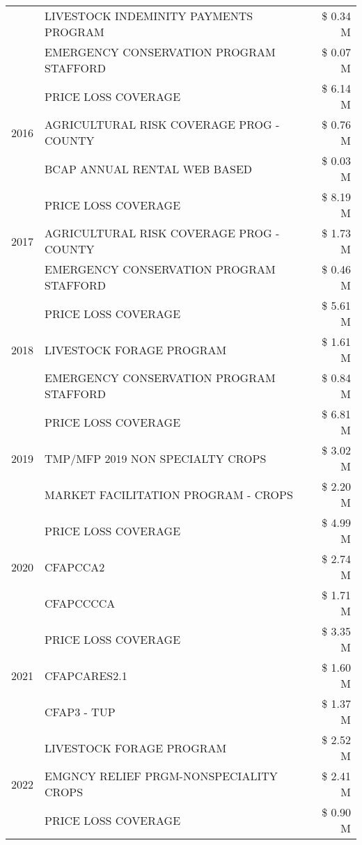 \begin{tabular}{llr}
 & LIVESTOCK INDEMINITY PAYMENTS PROGRAM & \$ 0.34 M \\
 & EMERGENCY CONSERVATION PROGRAM STAFFORD & \$ 0.07 M \\
\cline{1-3}
\multirow[t]{3}{*}{2016} & PRICE LOSS COVERAGE & \$ 6.14 M \\
 & AGRICULTURAL RISK COVERAGE PROG - COUNTY & \$ 0.76 M \\
 & BCAP ANNUAL RENTAL WEB BASED & \$ 0.03 M \\
\cline{1-3}
\multirow[t]{3}{*}{2017} & PRICE LOSS COVERAGE & \$ 8.19 M \\
 & AGRICULTURAL RISK COVERAGE PROG - COUNTY & \$ 1.73 M \\
 & EMERGENCY CONSERVATION PROGRAM STAFFORD & \$ 0.46 M \\
\cline{1-3}
\multirow[t]{3}{*}{2018} & PRICE LOSS COVERAGE & \$ 5.61 M \\
 & LIVESTOCK FORAGE PROGRAM & \$ 1.61 M \\
 & EMERGENCY CONSERVATION PROGRAM STAFFORD & \$ 0.84 M \\
\cline{1-3}
\multirow[t]{3}{*}{2019} & PRICE LOSS COVERAGE & \$ 6.81 M \\
 & TMP/MFP 2019 NON SPECIALTY CROPS & \$ 3.02 M \\
 & MARKET FACILITATION PROGRAM - CROPS & \$ 2.20 M \\
\cline{1-3}
\multirow[t]{3}{*}{2020} & PRICE LOSS COVERAGE & \$ 4.99 M \\
 & CFAPCCA2 & \$ 2.74 M \\
 & CFAPCCCCA & \$ 1.71 M \\
\cline{1-3}
\multirow[t]{3}{*}{2021} & PRICE LOSS COVERAGE & \$ 3.35 M \\
 & CFAPCARES2.1 & \$ 1.60 M \\
 & CFAP3 - TUP & \$ 1.37 M \\
\cline{1-3}
\multirow[t]{3}{*}{2022} & LIVESTOCK FORAGE PROGRAM & \$ 2.52 M \\
 & EMGNCY RELIEF PRGM-NONSPECIALITY CROPS & \$ 2.41 M \\
 & PRICE LOSS COVERAGE & \$ 0.90 M \\
\cline{1-3}
\bottomrule
\end{tabular}
